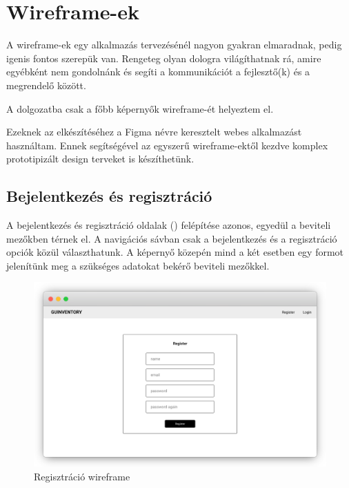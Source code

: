 \chapter{Wireframe-ek}

A wireframe-ek egy alkalmazás tervezésénél nagyon gyakran elmaradnak, pedig igenis fontos szerepük van.
Rengeteg olyan dologra világíthatnak rá, amire egyébként nem gondolnánk és segíti a kommunikációt a fejlesztő(k) és a megrendelő között.

A dolgozatba csak a főbb képernyők wireframe-ét helyeztem el.

Ezeknek az elkészítéséhez a Figma \cite{Figma} névre keresztelt webes alkalmazást használtam. 
Ennek segítségével az egyszerű wireframe-ektől kezdve komplex prototipizált design terveket is készíthetünk.

\section{Bejelentkezés és regisztráció}
A bejelentkezés és regisztráció oldalak () felépítése azonos, egyedül a beviteli mezőkben térnek el.
A navigációs sávban csak a bejelentkezés és a regisztráció opciók közül választhatunk. A képernyő közepén mind a két esetben egy formot jelenítünk meg a szükséges adatokat bekérő beviteli mezőkkel.
\begin{figure}[!ht]
  \centering
  \includegraphics[width=150mm, keepaspectratio]{figures/wireframes/frame_registration.png}
  \caption{Regisztráció wireframe}
  \label{fig:RegistrationWireframe}
\end{figure}


